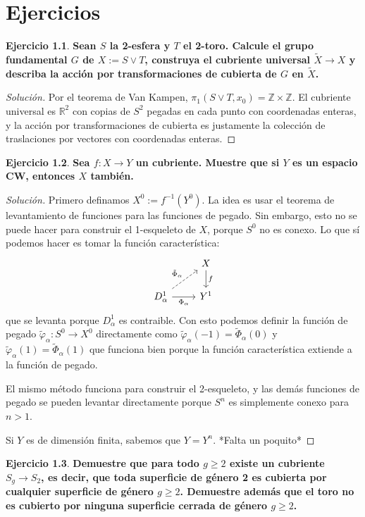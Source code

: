 \documentclass[spanish]{book}
\theoremstyle{definition}
\newtheorem*{ejer}{Ejercicio}
\newcommand{\R}{\mathbb{R}}
\newcommand{\Z}{\mathbb{Z}}
\begin{document}
\chapter{Ejercicios}
\begin{ejer}
	\textbf{Sean $S$ la 2-esfera y $T$ el 2-toro. Calcule el grupo fundamental $G$ de $X := S \vee T$, construya el cubriente universal $\widetilde{X} \to X$ y describa la acción por transformaciones de cubierta de $G$ en $\widetilde{X}$.}
	\begin{proof}[Solución] Por el teorema de Van Kampen, $\pi_1(S\vee T,x_0)=\Z\times\Z$. El cubriente universal es $\R^2$ con copias de $S^2$ pegadas en cada punto con coordenadas enteras, y la acción por transformaciones de cubierta es justamente la colección de traslaciones por vectores con coordenadas enteras.
	\end{proof}
\end{ejer}
\begin{ejer}
	\textbf{Sea $f:X\to Y$ un cubriente. Muestre que si $Y$ es un espacio CW, entonces $X$ también.}
\end{ejer}
\begin{proof}[Solución]
	Primero definamos $X^0:=f^{-1}(Y^0)$. La idea es usar el teorema de levantamiento de funciones para las funciones de pegado. Sin embargo, esto no se puede hacer para construir el 1-esqueleto de $X$, porque $S^0$ no es conexo. Lo que sí podemos hacer es tomar la función característica:
		\[\begin{tikzcd}
		&X\arrow[d,"f"]\\
		D_\alpha^1\arrow[ru,dashed,"\tilde{\Phi}_\alpha"]\arrow[r,swap,"\Phi_\alpha"]&Y^1
	\end{tikzcd}\]
	que se levanta porque $D^1_\alpha$ es contraible. Con esto podemos definir la función de pegado $\tilde{\varphi}_\alpha:S^0\to X^0$ directamente como $\tilde{\varphi}_\alpha(-1)=\tilde{\Phi}_\alpha(0)$ y $\tilde{\varphi}_\alpha(1)=\tilde{\Phi}_\alpha(1)$ que funciona bien porque la función característica extiende a la función de pegado.
	
	El mismo método funciona para construir el 2-esqueleto, y las demás funciones de pegado se pueden levantar directamente porque $S^n$ es simplemente conexo para $n>1$.
	
	Si $Y$ es de dimensión finita, sabemos que $Y=Y^n$. *Falta un poquito*
\end{proof}
\begin{ejer}
	\textbf{Demuestre que para todo $g\geq2$ existe un cubriente $S_g\to S_2$, es decir, que toda superficie de género 2 es cubierta por cualquier superficie de género $g\geq 2$. Demuestre además que el toro no es cubierto por ninguna superficie cerrada de género $g\geq2$.}
\end{ejer}
\end{document}
